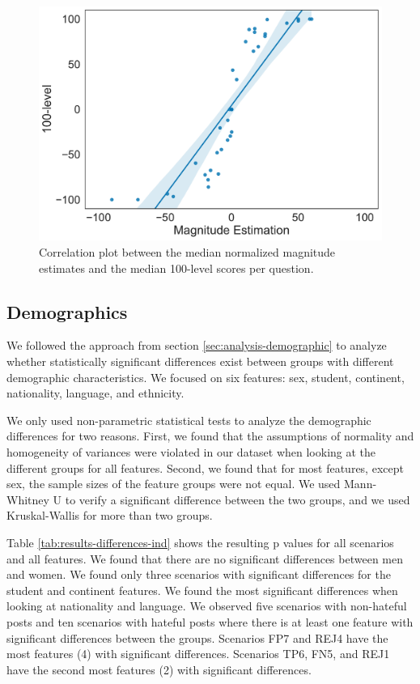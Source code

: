 \begin{figure}
    \centering
    \includegraphics[scale=.4]{Figures/correlation.pdf}
    \caption{Correlation plot between the median normalized magnitude estimates and the median 100-level scores per question.}
    \label{fig:correlation}
\end{figure}

\subsection{Demographics}
\label{sec:results-demographics}
We followed the approach from section \ref{sec:analysis-demographic} to analyze whether statistically significant differences exist between groups with different demographic characteristics.
%
We focused on six features: sex, student, continent, nationality, language, and ethnicity.
%

%
We only used non-parametric statistical tests to analyze the demographic differences for two reasons.
%
First, we found that the assumptions of normality and homogeneity of variances were violated in our dataset when looking at the different groups for all features.
%
Second, we found that for most features, except sex, the sample sizes of the feature groups were not equal.
%
We used Mann-Whitney U to verify a significant difference between the two groups, and we used Kruskal-Wallis for more than two groups.
%

%
Table \ref{tab:results-differences-ind} shows the resulting p values for all scenarios and all features.
%
We found that there are no significant differences between men and women.
%
We found only three scenarios with significant differences for the student and continent features.
%
We found the most significant differences when looking at nationality and language.
%
We observed five scenarios with non-hateful posts and ten scenarios with hateful posts where there is at least one feature with significant differences between the groups.
%
Scenarios FP7 and REJ4 have the most features (4) with significant differences.
%
Scenarios TP6, FN5, and REJ1 have the second most features (2) with significant differences.
%

